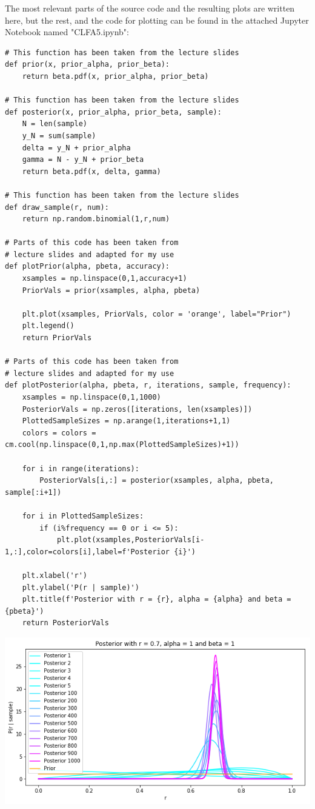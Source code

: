 The most relevant parts of the source code and the resulting plots are written here, but the rest, and the code for plotting can be found in the attached Jupyter Notebook named "CLFA5.ipynb":
\begin{verbatim}
# This function has been taken from the lecture slides
def prior(x, prior_alpha, prior_beta):
    return beta.pdf(x, prior_alpha, prior_beta)

# This function has been taken from the lecture slides
def posterior(x, prior_alpha, prior_beta, sample):
    N = len(sample)
    y_N = sum(sample)
    delta = y_N + prior_alpha
    gamma = N - y_N + prior_beta
    return beta.pdf(x, delta, gamma)

# This function has been taken from the lecture slides
def draw_sample(r, num):
    return np.random.binomial(1,r,num)

# Parts of this code has been taken from
# lecture slides and adapted for my use
def plotPrior(alpha, pbeta, accuracy):
    xsamples = np.linspace(0,1,accuracy+1)
    PriorVals = prior(xsamples, alpha, pbeta)
    
    plt.plot(xsamples, PriorVals, color = 'orange', label="Prior")
    plt.legend()
    return PriorVals

# Parts of this code has been taken from
# lecture slides and adapted for my use
def plotPosterior(alpha, pbeta, r, iterations, sample, frequency):
    xsamples = np.linspace(0,1,1000)
    PosteriorVals = np.zeros([iterations, len(xsamples)])
    PlottedSampleSizes = np.arange(1,iterations+1,1)
    colors = colors = cm.cool(np.linspace(0,1,np.max(PlottedSampleSizes)+1))
    
    for i in range(iterations):
        PosteriorVals[i,:] = posterior(xsamples, alpha, pbeta, sample[:i+1])

    for i in PlottedSampleSizes:
        if (i%frequency == 0 or i <= 5):
            plt.plot(xsamples,PosteriorVals[i-1,:],color=colors[i],label=f'Posterior {i}')
   
    plt.xlabel('r')
    plt.ylabel('P(r | sample)')
    plt.title(f'Posterior with r = {r}, alpha = {alpha} and beta = {pbeta}')
    return PosteriorVals
\end{verbatim}
\includegraphics[width=\linewidth]{2a.png}
